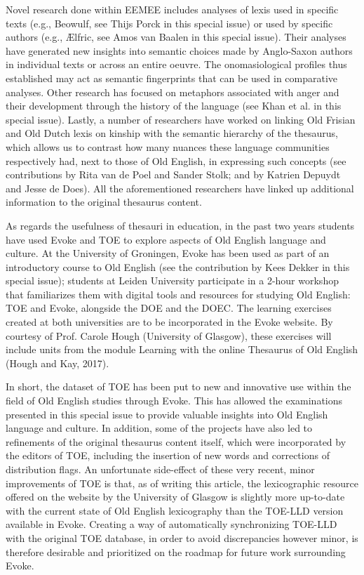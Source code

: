 Novel research done within EEMEE includes analyses of lexis used in specific texts (e.g., Beowulf, see Thijs Porck in this special issue) or used by specific authors (e.g., Ælfric, see Amos van Baalen in this special issue). Their analyses have generated new insights into semantic choices made by Anglo-Saxon authors in individual texts or across an entire oeuvre. The onomasiological profiles thus established may act as semantic fingerprints that can be used in comparative analyses. Other research has focused on metaphors associated with anger and their development through the history of the language (see Khan et al. in this special issue). Lastly, a number of researchers have worked on linking Old Frisian and Old Dutch lexis on kinship with the semantic hierarchy of the thesaurus, which allows us to contrast how many nuances these language communities respectively had, next to those of Old English, in expressing such concepts (see contributions by Rita van de Poel and Sander Stolk; and by Katrien Depuydt and Jesse de Does). All the aforementioned researchers have linked up additional information to the original thesaurus content.

As regards the usefulness of thesauri in education, in the past two years students have used Evoke and TOE to explore aspects of Old English language and culture. At the University of Groningen, Evoke has been used as part of an introductory course to Old English (see the contribution by Kees Dekker in this special issue); students at Leiden University participate in a 2-hour workshop that familiarizes them with digital tools and resources for studying Old English: TOE and Evoke, alongside the DOE and the DOEC.  The learning exercises created at both universities are to be incorporated in the Evoke website. By courtesy of Prof. Carole Hough (University of Glasgow), these exercises will include units from the module Learning with the online Thesaurus of Old English (Hough and Kay, 2017). 

In short, the dataset of TOE has been put to new and innovative use within the field of Old English studies through Evoke. This has allowed the examinations presented in this special issue to provide valuable insights into Old English language and culture. In addition, some of the projects have also led to refinements of the original thesaurus content itself, which were incorporated by the editors of TOE, including the insertion of new words and corrections of distribution flags. An unfortunate side-effect of these very recent, minor improvements of TOE is that, as of writing this article, the lexicographic resource offered on the website by the University of Glasgow is slightly more up-to-date with the current state of Old English lexicography than the TOE-LLD version available in Evoke. Creating a way of automatically synchronizing TOE-LLD with the original TOE database, in order to avoid discrepancies however minor, is therefore desirable and prioritized on the roadmap for future work surrounding Evoke.

